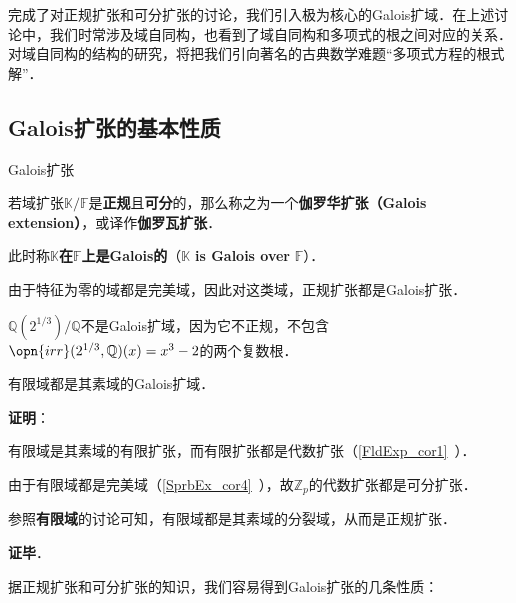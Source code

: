 


完成了对正规扩张和可分扩张的讨论，我们引入极为核心的Galois扩域．在上述讨论中，我们时常涉及域自同构，也看到了域自同构和多项式的根之间对应的关系．对域自同构的结构的研究，将把我们引向著名的古典数学难题“多项式方程的根式解”．



\subsection{Galois扩张的基本性质}

\begin{definition}{Galois扩张}

若域扩张$\mathbb{K}/\mathbb{F}$是\textbf{正规}且\textbf{可分}的，那么称之为一个\textbf{伽罗华扩张（Galois extension）}，或译作\textbf{伽罗瓦扩张}．

此时称$\mathbb{K}$\textbf{在}$\mathbb{F}$\textbf{上是Galois的}（$\mathbb{K}$ \textbf{is Galois over} $\mathbb{F}$）．

\end{definition}

由于特征为零的域都是完美域，因此对这类域，正规扩张都是Galois扩张．

\begin{example}{}
$\mathbb{Q}(2^{1/3})/\mathbb{Q}$不是Galois扩域，因为它不正规，不包含$\opn{irr}(2^{1/3}, \mathbb{Q})(x)=x^3-2$的两个复数根．
\end{example}

\begin{theorem}{}
有限域都是其素域的Galois扩域．
\end{theorem}

\textbf{证明}：

有限域是其素域的有限扩张，而有限扩张都是代数扩张（\autoref{FldExp_cor1}~）．

由于有限域都是完美域（\autoref{SprbEx_cor4}~），故$\mathbb{Z}_p$的代数扩张都是可分扩张．

参照\textbf{有限域}的讨论可知，有限域都是其素域的分裂域，从而是正规扩张．

\textbf{证毕}．


据正规扩张和可分扩张的知识，我们容易得到Galois扩张的几条性质：


